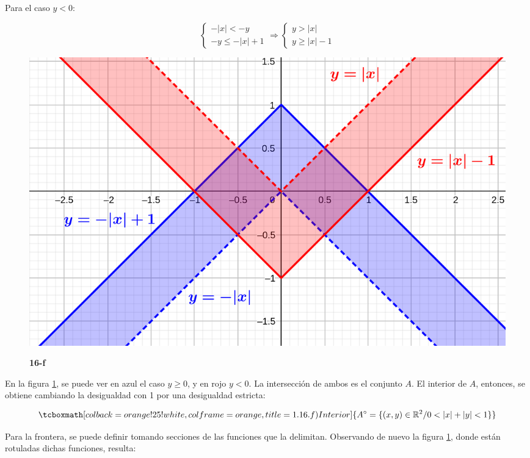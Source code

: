 \documentclass{article}
\renewcommand{\Bbb}{\mathbb}
\begin{document}
Para el caso $y < 0$:

\begin{equation}
\left\{
\begin{array}{ll}
-|x| < -y \\
-y \leq -|x| + 1
\end{array}
\right. \Rightarrow
\left\{
\begin{array}{ll}
y > |x| \\
y \geq |x| - 1
\end{array}
\right.
\end{equation}

\begin{figure}[ht]
\caption{\textbf{16-f}}
\includegraphics[scale=2.5]{img/ejercicios/1/16-f.png} 
\centering
\label{fig:1-16-f}
\end{figure}

En la figura \ref{fig:1-16-f}, se puede ver en azul el caso $y \geq 0$, y en rojo $y < 0$. La intersección de ambos es el conjunto $A$. El interior de $A$, entonces, se obtiene cambiando la desigualdad con 1 por una desigualdad estricta:

\begin{equation}
\tcboxmath[colback=orange!25!white,colframe=orange,title=1.16.f) Interior]
{ A^{\circ} = \{ (x,y) \in \Bbb R^2 / 0 < |x| + |y| < 1 \} }
\end{equation}

Para la frontera, se puede definir tomando secciones de las funciones que la delimitan. Observando de nuevo la figura \ref{fig:1-16-f}, donde están rotuladas dichas funciones, resulta:
\end{document}
